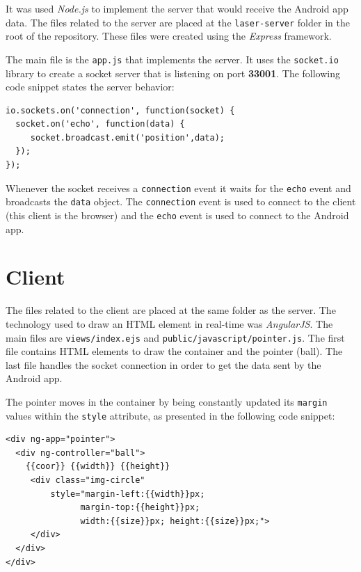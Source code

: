 \documentclass{llncs}
\begin{document}
It was used \textit{Node.js} to implement the server that would receive the Android app data. The files related to the server are placed at the \texttt{laser-server} folder in the root of the repository. These files were created using the \textit{Express} framework.

The main file is the \texttt{app.js} that implements the server. It uses the \texttt{socket.io} library to create a socket server that is listening on port \textbf{33001}. The following code snippet states the server behavior:

\begin{lstlisting}
io.sockets.on('connection', function(socket) {
  socket.on('echo', function(data) {
     socket.broadcast.emit('position',data);
  });
});
\end{lstlisting}

Whenever the socket receives a \texttt{connection} event it waits for the \texttt{echo} event and broadcasts the \texttt{data} object. The \texttt{connection} event is used to connect to the client (this client is the browser) and the \texttt{echo} event is used to connect to the Android app.

\section{Client}

The files related to the client are placed at the same folder as the server. The technology used to draw an HTML element in real-time was \textit{AngularJS}. The main files are \texttt{views/index.ejs} and \texttt{public/javascript/pointer.js}. The first file contains HTML elements to draw the container and the pointer (ball). The last file handles the socket connection in order to get the data sent by the Android app.

The pointer moves in the container by being constantly updated its \texttt{margin} values within the \texttt{style} attribute, as presented in the following code snippet:

\begin{lstlisting}
<div ng-app="pointer">
  <div ng-controller="ball">
    {{coor}} {{width}} {{height}}
     <div class="img-circle" 
         style="margin-left:{{width}}px; 
               margin-top:{{height}}px; 
               width:{{size}}px; height:{{size}}px;">
     </div>
  </div>
</div>
\end{lstlisting}
\end{document}
